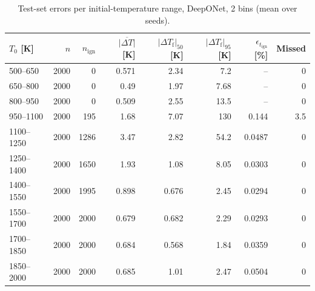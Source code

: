 \begin{table}[htbp]
    \centering
    \small
    \begin{tabular}{lrrrrrrr}
        \hline
        $T_0$ [K] & $n$ & $n_\mathrm{ign}$ & $\overline{|\Delta T|}$ [K] & $|\Delta T_\mathrm{f}|_{50}$ [K] & $|\Delta T_\mathrm{f}|_{95}$ [K] & $\epsilon_{t_\mathrm{ign}}$ [\%] & Missed \\
        \hline
        500--650 & 2000 & 0 & 0.571 & 2.34 & 7.2 & -- & 0 \\
        650--800 & 2000 & 0 & 0.49 & 1.97 & 7.68 & -- & 0 \\
        800--950 & 2000 & 0 & 0.509 & 2.55 & 13.5 & -- & 0 \\
        950--1100 & 2000 & 195 & 1.68 & 7.07 & 130 & 0.144 & 3.5 \\
        1100--1250 & 2000 & 1286 & 3.47 & 2.82 & 54.2 & 0.0487 & 0 \\
        1250--1400 & 2000 & 1650 & 1.93 & 1.08 & 8.05 & 0.0303 & 0 \\
        1400--1550 & 2000 & 1995 & 0.898 & 0.676 & 2.45 & 0.0294 & 0 \\
        1550--1700 & 2000 & 2000 & 0.679 & 0.682 & 2.29 & 0.0293 & 0 \\
        1700--1850 & 2000 & 2000 & 0.684 & 0.568 & 1.84 & 0.0359 & 0 \\
        1850--2000 & 2000 & 2000 & 0.685 & 1.01 & 2.47 & 0.0504 & 0 \\
        \hline
    \end{tabular}
    \caption{Test-set errors per initial-temperature range, DeepONet, 2 bins (mean over seeds).}
    \label{tab:T0_deeponet_predicted_b2}
\end{table}
